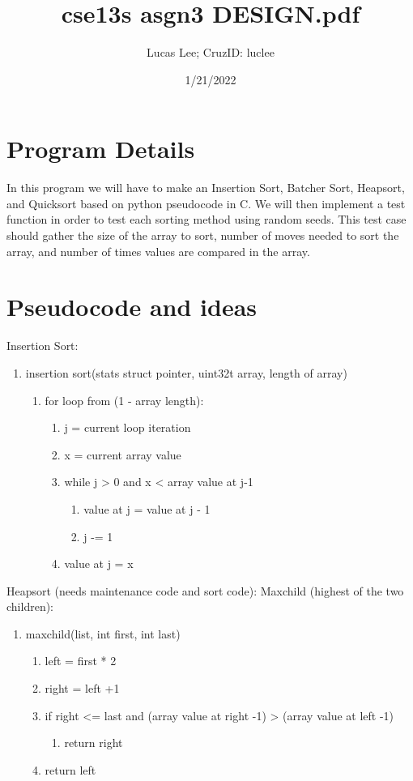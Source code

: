 \documentclass[11pt]{article}
\title{cse13s asgn3 DESIGN.pdf}
\author{Lucas Lee; CruzID: luclee}
\date{1/21/2022}
\begin{document}
\maketitle

\section{Program Details}\label{ss:details}
In this program we will have to make an Insertion Sort, Batcher Sort, Heapsort, and Quicksort based on python pseudocode in C. We will then implement a test function in order to test each sorting method using random seeds. This test case should gather the size of the array to sort, number of moves needed to sort the array, and number of times values are compared in the array.

\section{Pseudocode and ideas}\label{ss:pseudocode}
Insertion Sort:
\begin{enumerate}
\item insertion sort(stats struct pointer, uint32t array, length of array)
	\begin{enumerate}
	\item for loop from (1 - array length):
		\begin{enumerate}
		\item j = current loop iteration
		\item x = current array value
		\item while j > 0 and x < array value at j-1
			\begin{enumerate}
			\item value at j = value at j - 1
			\item j -= 1
			\end{enumerate}
		\item value at j = x
		\end{enumerate}
	\end{enumerate}
\end{enumerate}

Heapsort (needs maintenance code and sort code):
Maxchild (highest of the two children):
\begin{enumerate}
\item maxchild(list, int first, int last)
	\begin{enumerate}
	\item left = first * 2
	\item right = left +1
	\item if right <= last and (array value at right -1) > (array value at left -1)
		\begin{enumerate}
		\item return right
		\end{enumerate}
	\item return left
	\end{enumerate}
\end{enumerate}
\end{document}

